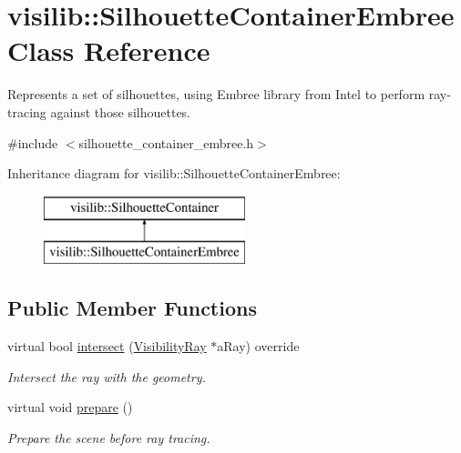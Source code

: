 \hypertarget{classvisilib_1_1_silhouette_container_embree}{}\section{visilib\+::Silhouette\+Container\+Embree Class Reference}
\label{classvisilib_1_1_silhouette_container_embree}


Represents a set of silhouettes, using Embree library from Intel to perform ray-\/tracing against those silhouettes. 




{\ttfamily \#include $<$silhouette\+\_\+container\+\_\+embree.\+h$>$}

Inheritance diagram for visilib\+::Silhouette\+Container\+Embree\+:\begin{figure}[H]
\begin{center}
\leavevmode
\includegraphics[height=2.000000cm]{classvisilib_1_1_silhouette_container_embree}
\end{center}
\end{figure}
\subsection*{Public Member Functions}
\begin{DoxyCompactItemize}
\item 
virtual bool \mbox{\hyperlink{classvisilib_1_1_silhouette_container_embree_a3cc23503bfa6f2db55762cf0851d6c69}{intersect}} (\mbox{\hyperlink{structvisilib_1_1_visibility_ray}{Visibility\+Ray}} $\ast$a\+Ray) override
\begin{DoxyCompactList}\small\item\em Intersect the ray with the geometry. \end{DoxyCompactList}\item 
virtual void \mbox{\hyperlink{classvisilib_1_1_silhouette_container_embree_ad3d6193f5484b3fb56096efd8a1230a8}{prepare}} ()
\begin{DoxyCompactList}\small\item\em Prepare the scene before ray tracing. \end{DoxyCompactList}\end{DoxyCompactItemize}
